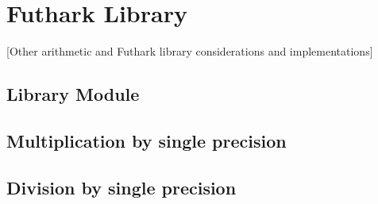 \section{Futhark Library}
\label{sec:cons}
[Other arithmetic and Futhark library considerations and implementations]

\subsection{Library Module}

\subsection{Multiplication by single precision}

\subsection{Division by single precision}



